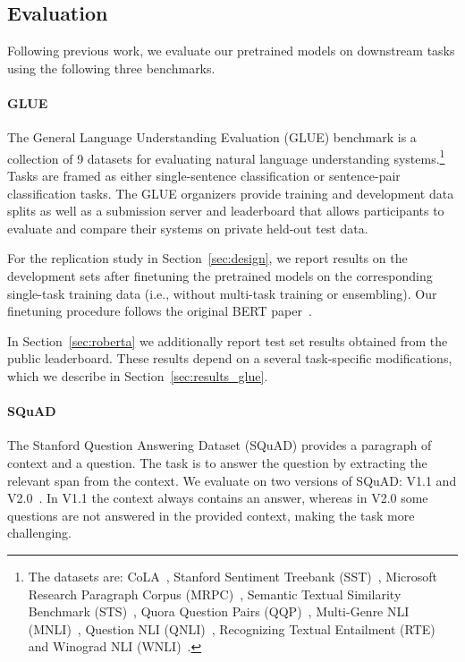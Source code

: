 \subsection{Evaluation} \label{sec:evaluation}

Following previous work, we evaluate our pretrained models on downstream tasks using the following three benchmarks.

\paragraph{GLUE} \label{sec:glue}

The General Language Understanding Evaluation (GLUE) benchmark \cite{wang2019glue} is a collection of 9 datasets for evaluating natural language understanding systems.\footnote{The datasets are: CoLA~\cite{warstadt2018neural}, Stanford Sentiment Treebank (SST)~\cite{socher2013recursive}, Microsoft Research Paragraph Corpus (MRPC)~\cite{dolan2005automatically}, Semantic Textual Similarity Benchmark (STS)~\cite{agirre2007semantic}, Quora Question Pairs (QQP)~\cite{iyer2016quora}, Multi-Genre NLI (MNLI)~\cite{williams2018broad}, Question NLI (QNLI)~\cite{rajpurkar2016squad}, Recognizing Textual Entailment (RTE)~\cite{dagan2006pascal,bar2006second,giampiccolo2007third,bentivogli2009fifth} and Winograd NLI (WNLI)~\cite{levesque2011winograd}.} Tasks are framed as either single-sentence classification or sentence-pair classification tasks. The GLUE organizers provide training and development data splits as well as a submission server and leaderboard that allows participants to evaluate and compare their systems on private held-out test data.

For the replication study in Section~\ref{sec:design}, we report results on the development sets after finetuning the pretrained models on the corresponding single-task training data (i.e., without multi-task training or ensembling). Our finetuning procedure follows the original BERT paper~\cite{devlin2018bert}.

In Section~\ref{sec:roberta} we additionally report test set results obtained from the public leaderboard. These results depend on a several task-specific modifications, which we describe in Section~\ref{sec:results_glue}.

\paragraph{SQuAD} \label{sec:squad}
The Stanford Question Answering Dataset (SQuAD) provides a paragraph of context and a  question. The task is to answer the question by extracting the relevant span from the context. We evaluate on two versions of SQuAD: V1.1 and V2.0~\cite{rajpurkar2016squad,rajpurkar2018know}. In V1.1 the context always contains an answer, whereas in V2.0 some questions are not answered in the provided context, making the task more challenging.


